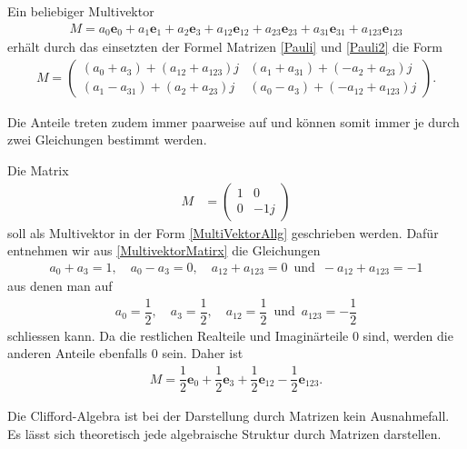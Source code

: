 \begin{hilfssatz}
	Ein beliebiger Multivektor
	\begin{align} \label{MultiVektorAllg}
	M = a_0\mathbf{e}_0 + a_1\mathbf{e}_1 + a_2\mathbf{e}_3 + a_{12}\mathbf{e}_{12} + a_{23}\mathbf{e}_{23} + a_{31}\mathbf{e}_{31} + a_{123}\mathbf{e}_{123}
	\end{align}
	erhält durch das einsetzten der Formel Matrizen \eqref{Pauli} und \eqref{Pauli2} die Form
	\begin{align}
	M =
	\begin{pmatrix}
	(a_0+a_3) + (a_{12}+a_{123})j & (a_1+a_{31})+(-a_2+a_{23})j \\
	(a_1-a_{31})+(a_2+a_{23})j & (a_0-a_3)+(-a_{12}+a_{123})j
	\end{pmatrix}.\label{MultivektorMatirx}
	\end{align}
\end{hilfssatz}
Die Anteile treten zudem immer paarweise auf und können somit immer je durch zwei Gleichungen bestimmt werden.
\begin{beispiel}
	Die Matrix
	\begin{align}
	M &= 
	\begin{pmatrix}
	1 & 0 \\
	0 & -1j
	\end{pmatrix}
	\end{align}
	soll als Multivektor in der Form \eqref{MultiVektorAllg} geschrieben werden. Dafür entnehmen wir aus \eqref{MultivektorMatirx} die Gleichungen
	\begin{align}
	a_0 + a_3 = 1,\quad a_0 - a_3 = 0,\quad a_{12}+a_{123} = 0\enspace\text{und}\enspace -a_{12}+a_{123}=-1
	\end{align}
	aus denen man auf
	\begin{align}
	a_0 = \dfrac{1}{2},\quad a_3 = \dfrac{1}{2},\quad a_{12}=\dfrac{1}{2}\enspace\text{und}\enspace a_{123}=-\dfrac{1}{2}
	\end{align}
	schliessen kann. Da die restlichen Realteile und Imaginärteile 0 sind, werden die anderen Anteile ebenfalls 0 sein. Daher ist
	\begin{align}
	M = \dfrac{1}{2} \mathbf{e}_0+ \dfrac{1}{2} \mathbf{e}_3 + \dfrac{1}{2} \mathbf{e}_{12} - \dfrac{1}{2} \mathbf{e}_{123}.
	\end{align}
\end{beispiel}
Die Clifford-Algebra ist bei der Darstellung durch Matrizen kein Ausnahmefall. Es lässt sich theoretisch jede algebraische Struktur durch Matrizen darstellen.